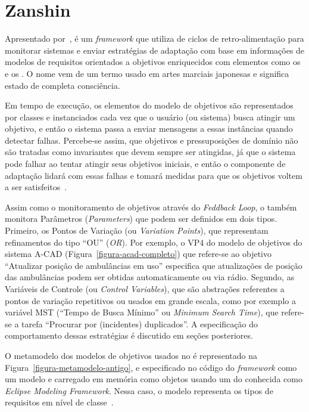 \section{Zanshin}
\label{sec-referencial-zanshin}

Apresentado por~\cite{tesevitor}, \zanshin é um \textit{framework} que utiliza de ciclos de retro-alimentação para monitorar sistemas e enviar estratégias de adaptação com base em informações de modelos de requisitos orientados a objetivos enriquecidos com elementos como os \awreqs e os \evoreqs. O nome \zanshin vem de um termo usado em artes marciais japonesas e significa estado de completa consciência.

Em tempo de execução, os elementos do modelo de objetivos são representados por classes e instanciados cada vez que o usuário (ou sistema) busca atingir um objetivo, e então o sistema passa a enviar mensagens a essas instâncias quando detectar falhas. Percebe-se assim, que objetivos e pressuposições de domínio não são tratadas como invariantes que devem sempre ser atingidas, já que o sistema pode falhar ao tentar atingir seus objetivos iniciais, e então o componente de adaptação lidará com essas falhas e tomará medidas para que os objetivos voltem a ser satisfeitos~\cite{souza2013requirements}.

Assim como o monitoramento de objetivos através do \textit{Feddback Loop}, o \zanshin também monitora Parâmetros (\textit{Parameters}) que podem ser definidos em dois tipos. Primeiro, os Pontos de Variação (ou \textit{Variation Points}), que representam refinamentos do tipo ``OU'' (\textit{OR}). Por exemplo, o VP4 do modelo de objetivos do sistema A-CAD (Figura~\ref{figura-acad-completo}) que refere-se ao objetivo ``Atualizar posição de ambulâncias em uso'' especifica que atualizações de posição das ambulâncias podem ser obtidas automaticamente ou via rádio. Segundo, as Variáveis de Controle (ou \textit{Control Variables}), que são abstrações referentes a pontos de variação repetitivos ou usados em grande escala, como por exemplo a variável MST (``Tempo de Busca Mínimo'' ou \textit{Minimum Search Time}), que refere-se a tarefa ``Procurar por (incidentes) duplicados''. A especificação do comportamento dessas estratégias é discutido em seções posteriores.

O metamodelo dos modelos de objetivos usados no \zanshin é representado na Figura~\ref{figura-metamodelo-antigo}, e especificado no código do \textit{framework} como um modelo \ecore e carregado em memória como objetos \java usando um \framework do \eclipse conhecida como \textit{Eclipse Modeling Framework}. Nessa caso, o modelo \ecore representa os tipos de requisitos em nível de classe~\cite{souza2013requirements}. 

